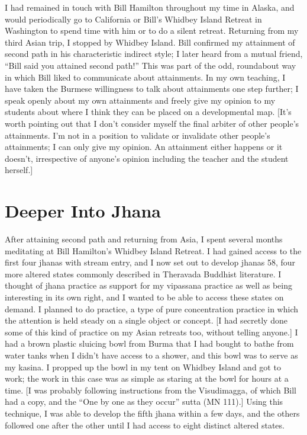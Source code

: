 \documentclass[a5paper,10pt,english]{book}
\begin{document}
\sphinxAtStartPar
I had remained in touch with Bill Hamilton throughout my time in Alaska,
and would periodically go to California or Bill’s Whidbey Island Retreat
in Washington to spend time with him or to do a silent retreat.
Returning from my third Asian trip, I stopped by Whidbey Island. Bill
confirmed my attainment of second path in his characteristic indirect
style; I later heard from a mutual friend, “Bill said you attained
second path!” This was part of the odd, roundabout way in which Bill
liked to communicate about attainments. In my own teaching, I have taken
the Burmese willingness to talk about attainments one step further; I
speak openly about my own attainments and freely give my opinion to my
students about where I think they can be placed on a developmental map.
{[}It’s worth pointing out that I don’t consider myself the final arbiter
of other people’s attainments. I’m not in a position to validate or
invalidate other people’s attainments; I can only give my opinion. An
attainment either happens or it doesn’t, irrespective of anyone’s
opinion including the teacher and the student herself.{]}


\section{Deeper Into Jhana}
\label{\detokenize{main-1:deeper-into-jhana}}
\sphinxAtStartPar
After attaining second path and returning from Asia, I spent several
months meditating at Bill Hamilton’s Whidbey Island Retreat. I had
gained access to the first four jhanas with stream entry, and I now set
out to develop jhanas 5\sphinxhyphen{}8, four more altered states commonly described
in Theravada Buddhist literature. I thought of jhana practice as support
for my vipassana practice as well as being interesting in its own right,
and I wanted to be able to access these states on demand. I planned to
do  practice, a type of pure concentration practice in which the
attention is held steady on a single object or concept. {[}I had secretly
done some of this kind of practice on my Asian retreats too, without
telling anyone.{]} I had a brown plastic sluicing bowl from Burma that I
had bought to bathe from water tanks when I didn’t have access to a
shower, and this bowl was to serve as my kasina. I propped up the bowl
in my tent on Whidbey Island and got to work; the work in this case was
as simple as staring at the bowl for hours at a time. {[}I was probably
following instructions from the Visudimagga, of which Bill had a copy,
and the “One by one as they occur” sutta (MN 111).{]} Using this
technique, I was able to develop the fifth jhana within a few days, and
the others followed one after the other until I had access to eight
distinct altered states.
\end{document}
